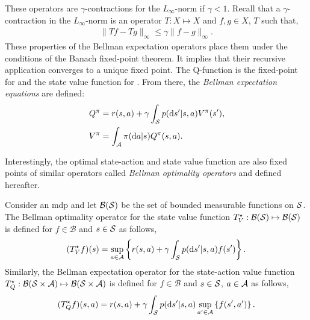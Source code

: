 These operators are $\gamma$-contractions for the $L_\infty$-norm \cite[Proposition~6.2.5]{puterman1994markov} if $\gamma<1$.
Recall that a $\gamma$-contraction in the $L_\infty$-norm is an operator $T:X\mapsto X$ and $f,g\in X$, $T$ such that,
\begin{align*}
    \lVert Tf - Tg\rVert_\infty\le\gamma\lVert f-g\rVert_\infty.
\end{align*}
These properties of the Bellman expectation operators place them under the conditions of the Banach fixed-point theorem. 
It implies that their recursive application converges to a unique fixed point.
The Q-function is the fixed-point for  and the state value function for .
From there, the \emph{Bellman expectation equations} are defined:
\begin{align}
    Q^\pi &= r(s,a) + \gamma  \int_{\mathcal{S}}  p(\mathrm{d} s'\vert s,a)V^\pi(s'),
    \label{eq:bellman_equation_Q}\\
    V^\pi &= \int_{\mathcal{A}} \pi(\mathrm{d} a\vert s) Q^\pi(s,a).
    \label{eq:bellman_equation_V}
\end{align}

Interestingly, the optimal state-action and state value function are also fixed points of similar operators called \emph{Bellman optimality operators} and defined hereafter. 

\begin{defi}
    Consider an \gls{mdp} and let $\mathcal{B}(\mathcal{S})$ be the set of bounded measurable functions on $\mathcal{S}$. 
    The Bellman optimality operator for the state value function $T^{\star}_V:\mathcal{B}(\mathcal{S})\mapsto\mathcal{B}(\mathcal{S})$ is defined for $f\in\mathcal{B}$ and $s\in\mathcal{S}$ as follows,
    \begin{align}
    \label{eq:bellman_optimal_operator_V}
        (T^{\star}_V f)(s) = \sup_{a\in\mathcal{A}}\left\{r(s,a) + \gamma  \int_{\mathcal{S}}  p(\mathrm{d} s'\vert s,a) f(s')\right\}.
    \end{align}
    Similarly, the Bellman expectation operator for the state-action value function $T^{\star}_Q:\mathcal{B}(\mathcal{S}\times\mathcal{A})\mapsto\mathcal{B}(\mathcal{S}\times\mathcal{A})$ is defined for $f\in\mathcal{B}$ and $s\in\mathcal{S}$, $a\in\mathcal{A}$ as follows,
    \begin{align}
    \label{eq:bellman_optimal_operator_Q}
        (T^{\star}_Q f)(s,a) = r(s,a) + \gamma  \int_{\mathcal{S}}  p(\mathrm{d} s'\vert s,a)\sup_{a'\in\mathcal{A}} \left\{f(s',a')\right\}.
    \end{align}
\end{defi} 

